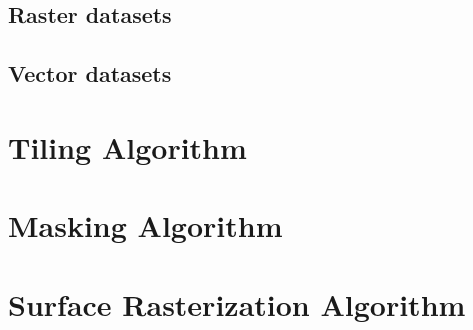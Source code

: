 \subsection{Raster datasets}


\clearpage
\subsection{Vector datasets}


\section{Tiling Algorithm}%
\label{sec:tiling-algorithm}


\section{Masking Algorithm}%
\label{sec:masking-algorithm}


\newpage
\section{Surface Rasterization Algorithm}%
\label{sec:surface-rasterization}

